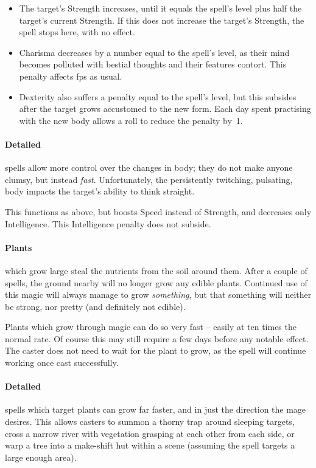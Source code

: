 \begin{multicols}{2}
\begin{itemize}
  \item
  The target's Strength increases, until it equals the spell's level plus half the target's current Strength.
  If this does not increase the target's Strength, the spell stops here, with no effect.
  \item
  Charisma decreases by a number equal to the spell's level, as their mind becomes polluted with bestial thoughts and their features contort.
  This penalty affects \glspl{fp} as usual.
  \item
  Dexterity also suffers a penalty equal to the spell's level, but this subsides after the target grows accustomed to the new form.
  Each day spent practising with the new body allows a  roll to reduce the penalty by~1.
\end{itemize}

\paragraph{Detailed}
spells allow more control over the changes in body; they do not make anyone clumsy, but instead \emph{fast}.
Unfortunately, the persistently twitching, pulsating, body impacts the target's ability to think straight.

This functions as above, but boosts Speed instead of Strength, and decreases only Intelligence.
This Intelligence penalty does not subside.

\paragraph{Plants}
which grow large steal the nutrients from the soil around them.
After a couple of spells, the ground nearby will no longer grow any edible plants.
Continued use of this magic will always manage to grow \emph{something}, but that something will neither be strong, nor pretty (and definitely not edible).

Plants which grow through magic can do so very fast -- easily at ten times the normal rate.
Of course this may still require a few days before any notable effect.
The caster does not need to wait for the plant to grow, as the spell will continue working once cast successfully.

\paragraph{Detailed}
spells which target plants can grow far faster, and in just the direction the mage desires.
This allows casters to summon a thorny trap around sleeping targets, cross a narrow river with vegetation grasping at each other from each side, or warp a tree into a make-shift hut within a scene (assuming the spell targets a large enough area).


\end{multicols}
